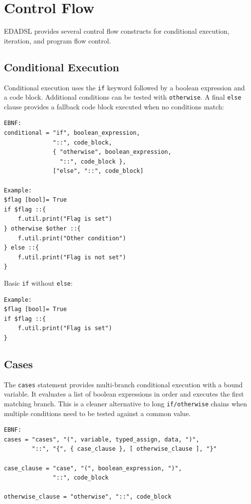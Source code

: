 \chapter{Control Flow}
EDADSL provides several control flow constructs for conditional execution, iteration, and program flow control.

\section{Conditional Execution}
Conditional execution uses the \texttt{if} keyword followed by a boolean expression and a code block. Additional conditions can be tested with \texttt{otherwise}. A final \texttt{else} clause provides a fallback code block executed when no conditions match:
\begin{verbatim}
EBNF:
conditional = "if", boolean_expression, 
              "::", code_block,
              { "otherwise", boolean_expression, 
                "::", code_block },
              ["else", "::", code_block]

Example:
$flag [bool]= True
if $flag ::{
    f.util.print("Flag is set")
} otherwise $other ::{
    f.util.print("Other condition")
} else ::{
    f.util.print("Flag is not set")
}
\end{verbatim}

Basic \texttt{if} without \texttt{else}:
\begin{verbatim}
Example:
$flag [bool]= True
if $flag ::{
    f.util.print("Flag is set")
}
\end{verbatim}

\section{Cases}
The \texttt{cases} statement provides multi-branch conditional execution with a bound variable. It evaluates a list of boolean expressions in order and executes the first matching branch. This is a cleaner alternative to long \texttt{if/otherwise} chains when multiple conditions need to be tested against a common value.

\begin{verbatim}
EBNF:
cases = "cases", "(", variable, typed_assign, data, ")", 
        "::", "{", { case_clause }, [ otherwise_clause ], "}"

case_clause = "case", "(", boolean_expression, ")", 
              "::", code_block

otherwise_clause = "otherwise", "::", code_block
\end{verbatim}

